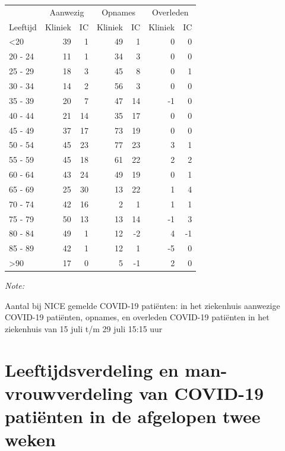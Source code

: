 \documentclass[
  english,
  man,floatsintext]{apa6}
\begin{document}
\begin{table}
\centering\begingroup\fontsize{10}{12}\selectfont

\begin{threeparttable}
\begin{tabular}{lrrrrrr}
\toprule
\multicolumn{1}{c}{ } & \multicolumn{2}{c}{Aanwezig} & \multicolumn{2}{c}{Opnames} & \multicolumn{2}{c}{Overleden} \\
\cmidrule(l{3pt}r{3pt}){2-3} \cmidrule(l{3pt}r{3pt}){4-5} \cmidrule(l{3pt}r{3pt}){6-7}
Leeftijd & Kliniek & IC & Kliniek & IC & Kliniek & IC\\
\midrule
<20 & 39 & 1 & 49 & 1 & 0 & 0\\
20 - 24 & 11 & 1 & 34 & 3 & 0 & 0\\
25 - 29 & 18 & 3 & 45 & 8 & 0 & 1\\
30 - 34 & 14 & 2 & 56 & 3 & 0 & 0\\
35 - 39 & 20 & 7 & 47 & 14 & -1 & 0\\
40 - 44 & 21 & 14 & 35 & 17 & 0 & 0\\
45 - 49 & 37 & 17 & 73 & 19 & 0 & 0\\
50 - 54 & 45 & 23 & 77 & 23 & 3 & 1\\
55 - 59 & 45 & 18 & 61 & 22 & 2 & 2\\
60 - 64 & 43 & 24 & 49 & 19 & 0 & 1\\
65 - 69 & 25 & 30 & 13 & 22 & 1 & 4\\
70 - 74 & 42 & 16 & 2 & 1 & 1 & 1\\
75 - 79 & 50 & 13 & 13 & 14 & -1 & 3\\
80 - 84 & 49 & 1 & 12 & -2 & 4 & -1\\
85 - 89 & 42 & 1 & 12 & 1 & -5 & 0\\
>90 & 17 & 0 & 5 & -1 & 2 & 0\\
\bottomrule
\end{tabular}
\begin{tablenotes}
\item \textit{Note: } 
\item Aantal bij NICE gemelde COVID-19 patiënten: in het ziekenhuis aanwezige COVID-19 patiënten, opnames, en overleden COVID-19 patiënten in het ziekenhuis van 15 juli t/m 29 juli 15:15 uur
\end{tablenotes}
\end{threeparttable}
\endgroup{}
\end{table}

\newpage

\hypertarget{leeftijdsverdeling-en-man-vrouwverdeling-van-covid-19-patiuxebnten-in-de-afgelopen-twee-weken}{%
\section{Leeftijdsverdeling en man-vrouwverdeling van COVID-19 patiënten in de afgelopen twee weken}\label{leeftijdsverdeling-en-man-vrouwverdeling-van-covid-19-patiuxebnten-in-de-afgelopen-twee-weken}}
\end{document}
